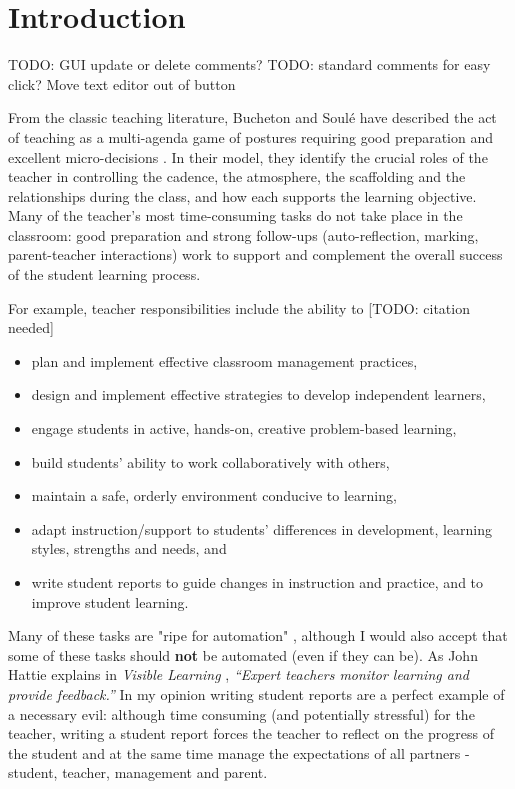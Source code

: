 \documentclass[10pt]{article}
\begin{document}
\tableofcontents



\section{Introduction}

TODO: GUI update or delete comments?
TODO: standard comments for easy click? Move text editor out of button

From the classic teaching literature, Bucheton and Soulé have described the act of teaching as a multi-agenda game of postures requiring good preparation and excellent micro-decisions \cite{BS09}. In their model, they identify the crucial roles of the teacher in controlling the cadence, the atmosphere, the scaffolding and the relationships during the class, and how each supports the learning objective. Many of the teacher's most time-consuming tasks do not take place in the classroom: good preparation and strong follow-ups (auto-reflection, marking, parent-teacher interactions) work to support and complement the overall success of the student learning process.

For example, teacher responsibilities include the ability to [TODO: citation needed]
\begin{itemize}
\item plan and implement effective classroom management practices,
\item design and implement effective strategies to develop independent learners,
\item engage students in active, hands-on, creative problem-based learning,
\item build students’ ability to work collaboratively with others,
\item maintain a safe, orderly environment conducive to learning,
\item adapt instruction/support to students’ differences in development, learning styles, strengths and needs, and
\item write student reports to guide changes in instruction and practice, and to improve student learning.
\end{itemize}

Many of these tasks are "ripe for automation" \cite[p.?]{Swei15}, although I would also accept that some of these tasks should \textbf{not} be automated (even if they can be). As John Hattie explains in \emph{Visible Learning} \cite{Hat12}, \emph{``Expert teachers monitor learning and provide feedback.''} In my opinion writing student reports are a perfect example of a necessary evil: although time consuming (and potentially stressful) for the teacher, writing a student report forces the teacher to reflect on the progress of the student and at the same time manage the expectations of all partners - student, teacher, management and parent.
\end{document}
